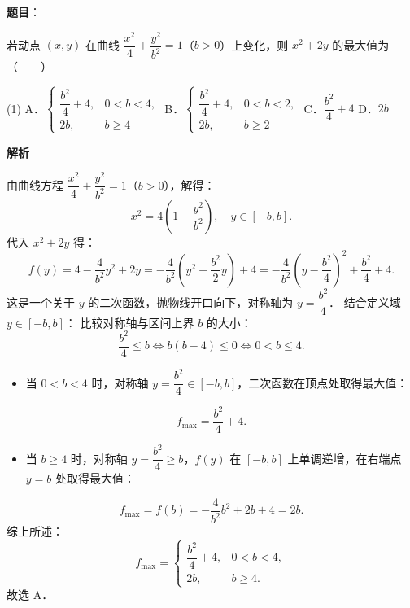 \begin{answer}

\textbf{题目}：

若动点 $(x, y)$ 在曲线 $\dfrac{x^2}{4} + \dfrac{y^2}{b^2} = 1$（$b > 0$）上变化，则 $x^2 + 2y$ 的最大值为\mbox{（　　）}

\begin{gkopts}(1)
\task A．$\begin{cases} \dfrac{b^2}{4} + 4, & 0 < b < 4, \\ 2b, & b \geqslant 4 \end{cases}$
\task B．$\begin{cases} \dfrac{b^2}{4} + 4, & 0 < b < 2, \\ 2b, & b \geqslant 2 \end{cases}$
\task C．$\dfrac{b^2}{4} + 4$
\task D．$2b$
\end{gkopts}

\textbf{解析}

由曲线方程 $\dfrac{x^2}{4} + \dfrac{y^2}{b^2} = 1$（$b > 0$），解得：
\nopagebreak[4]
\[
x^2 = 4\left(1 - \frac{y^2}{b^2}\right), \quad y \in [-b, b].
\]
代入 $x^2 + 2y$ 得：
\nopagebreak[4]
\[
f(y) = 4 - \frac{4}{b^2}y^2 + 2y = -\frac{4}{b^2}\left(y^2 - \frac{b^2}{2}y\right) + 4 = -\frac{4}{b^2}\left(y - \frac{b^2}{4}\right)^2 + \frac{b^2}{4} + 4.
\]
这是一个关于 $y$ 的二次函数，抛物线开口向下，对称轴为 $y = \dfrac{b^2}{4}$．
结合定义域 $y \in [-b, b]$：
比较对称轴与区间上界 $b$ 的大小：
\nopagebreak[4]
\[
\frac{b^2}{4} \leqslant b \iff b(b - 4) \leqslant 0 \iff 0 < b \leqslant 4.
\]
\begin{itemize}
\item 当 $0 < b < 4$ 时，对称轴 $y = \dfrac{b^2}{4} \in [-b, b]$，二次函数在顶点处取得最大值：
\end{itemize}
\nopagebreak[4]
\[
f_{\max} = \frac{b^2}{4} + 4.
\]
\begin{itemize}
\item 当 $b \geqslant 4$ 时，对称轴 $y = \dfrac{b^2}{4} \geqslant b$，$f(y)$ 在 $[-b, b]$ 上单调递增，在右端点 $y = b$ 处取得最大值：
\end{itemize}
\nopagebreak[4]
\[
f_{\max} = f(b) = -\frac{4}{b^2}b^2 + 2b + 4 = 2b.
\]
综上所述：
\nopagebreak[4]
\[
f_{\max} = \begin{cases} \dfrac{b^2}{4} + 4, & 0 < b < 4, \\ 2b, & b \geqslant 4. \end{cases}
\]
故选 A．


\end{answer}

